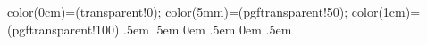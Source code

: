     {\pgfpointorigin}
    {
        color(0cm)=(transparent!0);
        color(5mm)=(pgftransparent!50);
        color(1cm)=(pgftransparent!100)
    }
    {}
    {\topsep}               %
    {\topsep}               %
    {}                      %
    {}                      %
    {\bfseries}             %
    {}                      %
    {.5em}                  %
    {}
    {\topsep}               %
    {\topsep}               %
    {\itshape}              %
    {}                      %
    {\bfseries}             %
    {}                      %
    {.5em}                  %
    {}              
    {0em}                   %
    {\topsep}               %
    {}                      %
    {}                      %
    {\bfseries}             %
    {}                      %
    {.5em}                  %
    {}
    {0em}                   %
    {\topsep}               %
    {\itshape}              %
    {}                      %
    {\bfseries}             %
    {}                      %
    {.5em}                  %
    {}
    {\topsep}               %
